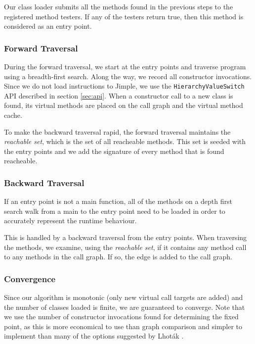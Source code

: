 \documentclass[preprint]{sigplanconf}
\begin{document}
Our class loader submits all the methods found in the previous steps to the registered method testers. If any of the testers return true, then this method is considered as an entry point.

\subsubsection{Forward Traversal}

During the forward traversal, we start at the entry points and traverse program using a breadth-first search. Along the way, we record all constructor invocations. Since we do not load instructions to Jimple, we use the {\tt HierarchyValueSwitch} API described in section \ref{sec:api}.
When a constructor call to a new class is found, its virtual methods are placed on the call graph and the virtual method cache.

To make the backward traversal rapid, the forward traversal maintains the \emph{reachable set}, which is the set of all reacheable methods. This set is seeded with the entry points and we add the signature of every method that is found reacheable.


\subsubsection{Backward Traversal}
If an entry point is not a main function, all of the methods on a depth first search walk from a main to the entry point need to be loaded in order to accurately represent the runtime behaviour.

This is handled by a backward traversal from the entry points. When traversing the methods, we examine, using the \emph{reachable set}, if it contains any method call to any methods in the call graph. If so, the edge is added to the call graph.

\subsubsection{Convergence}
Since our algorithm is monotonic (only new virtual call targets are added) and the number of classes loaded is finite, we are guaranteed to converge. Note that we use the number of constructor invocations found for determining the fixed point, as this is more economical to use than graph comparison and simpler to implement than many of the options suggested by Lhoták \cite{lhot02}.
\end{document}
